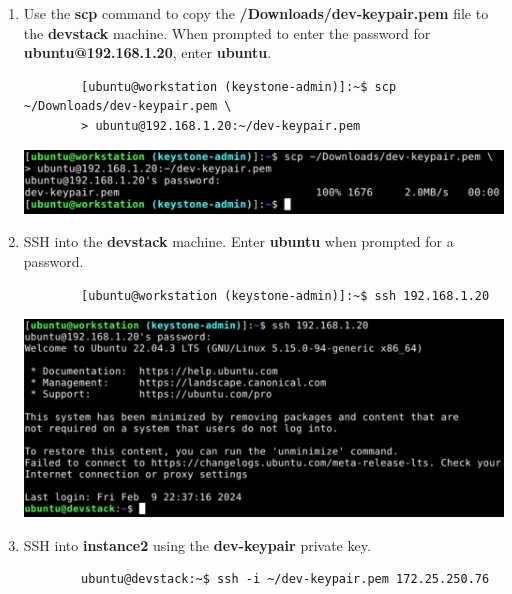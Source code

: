 \documentclass[letterpaper, 12pt]{article}
\begin{document}
\begin{enumerate}
    \item Use the \textbf{scp} command to copy the \textbf{\texttildemid/Downloads/dev-keypair.pem} file to
    the \textbf{devstack} machine. When prompted to enter the password for \textbf{ubuntu@192.168.1.20}, enter
    \textbf{ubuntu}.
    \begin{lstlisting}
        [ubuntu@workstation (keystone-admin)]:~$ scp ~/Downloads/dev-keypair.pem \
        > ubuntu@192.168.1.20:~/dev-keypair.pem
    \end{lstlisting}

    \begin{center}
        \includegraphics[width=\linewidth]{images/part3/step8.png}
    \end{center}

    \item SSH into the \textbf{devstack} machine. Enter \textbf{ubuntu} when prompted for a password.
    \begin{lstlisting}
        [ubuntu@workstation (keystone-admin)]:~$ ssh 192.168.1.20
    \end{lstlisting}

    \begin{center}
        \includegraphics[width=\linewidth]{images/part3/step9.png}
    \end{center}

    \item SSH into \textbf{instance2} using the \textbf{dev-keypair} private key.
    \begin{lstlisting}
        ubuntu@devstack:~$ ssh -i ~/dev-keypair.pem 172.25.250.76
    \end{lstlisting}


\end{enumerate}
\end{document}
